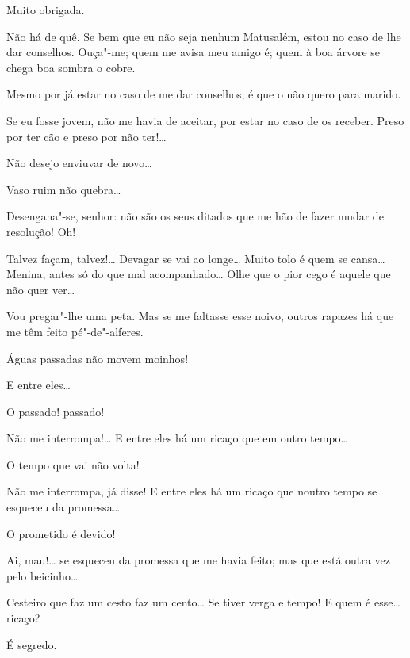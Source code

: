 \begin{linenumbers}
  Muito obrigada. 

  Não há de quê. Se bem que eu não seja nenhum Matusalém, estou no
caso de lhe dar conselhos. Ouça"-me; quem me avisa meu amigo é; quem à boa árvore
se chega boa sombra o cobre.

  Mesmo por já estar no caso de me dar conselhos, é que o não quero
para marido.

  Se eu fosse jovem, não me havia de aceitar, por estar no caso de
os receber. Preso por ter cão e preso por não ter!\ldots{}

  Não desejo enviuvar de novo\ldots{}

  Vaso ruim não quebra\ldots{}

  Desengana"-se, senhor: não são os seus ditados que me hão de fazer
mudar de resolução!  Oh!

  Talvez façam, talvez!\ldots{} Devagar se
vai ao longe\ldots{} Muito tolo é quem se cansa\ldots{}  Menina,
antes só do que mal acompanhado\ldots{} Olhe que o pior cego é aquele que não
quer ver\ldots{}

   Vou pregar"-lhe uma peta.   Mas se me
faltasse esse noivo, outros rapazes há que me têm feito pé"-de"-alferes.

  Águas passadas não movem moinhos!

  E entre eles\ldots{}

 O passado! passado!

  Não me interrompa!\ldots{} E entre eles há um ricaço que em outro
tempo\ldots{}

 O tempo que vai não volta!

  Não me interrompa, já disse! E entre eles há um ricaço que noutro
tempo se esqueceu da promessa\ldots{}

  O prometido é devido!

  Ai, mau!\ldots{} se esqueceu da promessa que me havia feito; mas
que está outra vez pelo beicinho\ldots{}

  Cesteiro que faz um cesto faz um cento\ldots{}  Se tiver verga e tempo! E quem é esse\ldots{} ricaço?

  É segredo.


\end{linenumbers}
